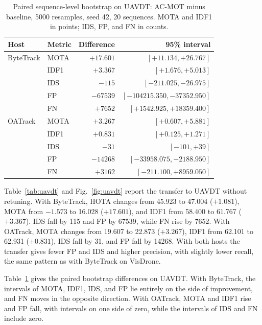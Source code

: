 \documentclass[pdflatex,sn-mathphys-num,iicol]{sn-jnl}
\begin{document}
\begin{table}[t]
\caption{Paired sequence-level bootstrap on UAVDT: AC-MOT minus baseline,
5000 resamples, seed 42, 20 sequences. MOTA and IDF1 in points; IDS, FP, and
FN in counts.}
\label{tab:uavdt-boot}
\centering\footnotesize
\setlength{\tabcolsep}{4pt}
\begin{tabular}{@{}llrr@{}}
\toprule
Host & Metric & Difference & 95\% interval\\
\midrule
ByteTrack & MOTA & $+17.601$ & $[+11.134, +26.767]$\\
 & IDF1 & $+3.367$ & $[+1.676, +5.013]$\\
 & IDS & $-115$ & $[-211.025, -26.975]$\\
 & FP & $-67539$ & $[-104215.350, -37352.950]$\\
 & FN & $+7652$ & $[+1542.925, +18359.400]$\\
\midrule
OATrack & MOTA & $+3.267$ & $[+0.607, +5.881]$\\
 & IDF1 & $+0.831$ & $[+0.125, +1.271]$\\
 & IDS & $-31$ & $[-101, +39]$\\
 & FP & $-14268$ & $[-33958.075, -2188.950]$\\
 & FN & $+3162$ & $[-211.100, +8959.050]$\\
\bottomrule
\end{tabular}
\end{table}

Table~\ref{tab:uavdt} and Fig.~\ref{fig:uavdt} report the transfer to UAVDT
without retuning. With ByteTrack, HOTA changes from 45.923 to 47.004 ($+1.081$),
MOTA from $-1.573$ to 16.028 ($+17.601$), and IDF1 from 58.400 to 61.767
($+3.367$). IDS fall by 115 and FP by 67539, while FN rise by 7652. With
OATrack, MOTA changes from 19.607 to 22.873 ($+3.267$), IDF1 from 62.101 to
62.931 ($+0.831$), IDS fall by 31, and FP fall by 14268. With both hosts the
transfer gives fewer FP and IDS and higher precision, with slightly lower
recall, the same pattern as with ByteTrack on VisDrone.

Table~\ref{tab:uavdt-boot} gives the paired bootstrap differences on UAVDT.
With ByteTrack, the intervals of MOTA, IDF1, IDS, and FP lie entirely on the
side of improvement, and FN moves in the opposite direction. With OATrack,
MOTA and IDF1 rise and FP fall, with intervals on one side of zero, while the
intervals of IDS and FN include zero.
\end{document}
